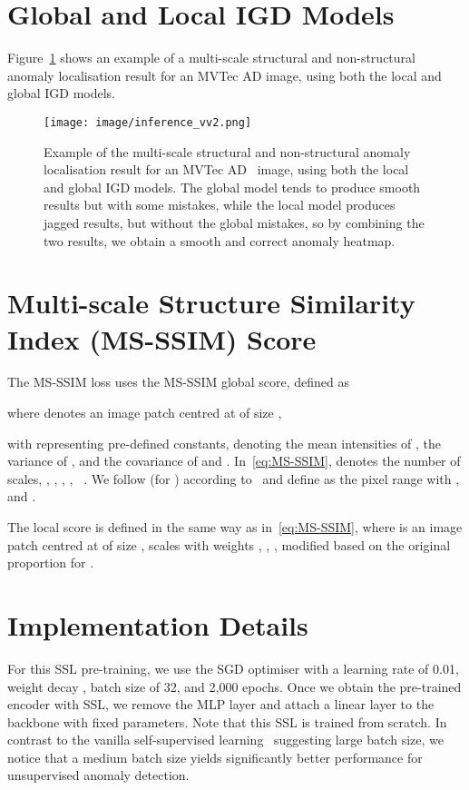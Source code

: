 \documentclass[letterpaper]{article} \usepackage{aaai22}  \usepackage{times}  \usepackage{helvet}  \usepackage{courier}  \usepackage[hyphens]{url}  \usepackage{graphicx} \urlstyle{rm} \def\UrlFont{\rm}  \usepackage{natbib}  \usepackage{caption} \DeclareCaptionStyle{ruled}{labelfont=normalfont,labelsep=colon,strut=off} \frenchspacing  \setlength{\pdfpagewidth}{8.5in}  \setlength{\pdfpageheight}{11in}  \usepackage{algorithm}
\begin{document}
\section{Global and Local IGD Models}

Figure~\ref{fig:multi-test} shows an example of a multi-scale structural and non-structural anomaly localisation result for an MVTec AD image, using both the local and global IGD models.

\begin{figure}[htp]
    \centering
    \texttt{[image: image/inference\_vv2.png]}
   \caption{Example of the multi-scale structural and non-structural anomaly localisation result for an MVTec AD~\cite{mvtecad} image, using both the local and global IGD models. The global model tends to produce smooth results but with some mistakes, while the local model produces jagged results, but without the global mistakes, so by combining the two results, we obtain a smooth and correct anomaly heatmap.  }
    \label{fig:multi-test}
\end{figure}

\section{Multi-scale Structure Similarity Index (MS-SSIM) Score}
The MS-SSIM loss uses the MS-SSIM global score, defined as 

where  denotes an image patch centred at  of size ,


 
 with  representing pre-defined constants,  denoting the mean intensities of , 
the variance of , and
 the covariance of  and . 
In~\eqref{eq:MS-SSIM}, 
 denotes the number of scales,  , , , , ~\cite{MS-SSIM}. We follow  (for ) according to~\cite{SSIM} and define  as the pixel range with ,  and .


The local score  is defined in the same way as in~\eqref{eq:MS-SSIM}, where  is an image patch centred at  of size ,
 scales with weights , , ,  modified based on the original proportion for . 


\section{Implementation Details}






For this SSL pre-training, we use the SGD optimiser with a learning rate of 0.01,  weight decay , batch size of 32, and 2,000 epochs. Once we obtain the pre-trained encoder with SSL, we remove the MLP layer and attach a linear layer to the backbone with fixed parameters. Note that this SSL is trained from scratch. 
In contrast to the vanilla self-supervised learning~\cite{chen2020simple} suggesting large batch size, we notice that a medium batch size yields significantly better performance for unsupervised anomaly detection. 
\end{document}
